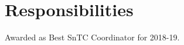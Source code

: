 \documentclass[a4paper]{deedy-resume-openfont}
\begin{document}
\begin{minipage}[t]{0.66\textwidth}



\section{Responsibilities} 
Awarded as Best SnTC Coordinator for 2018-19.
\sectionsep

\end{minipage} 
\end{document}
